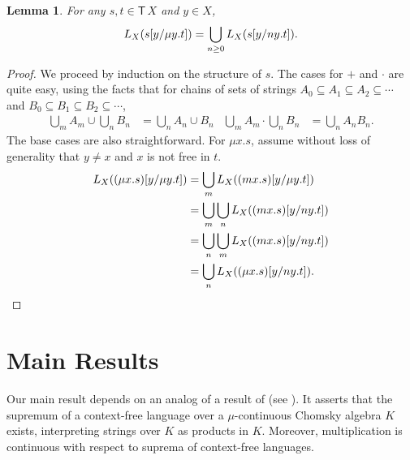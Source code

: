 \documentclass[copyright,creativecommons]{eptcs}
\newtheorem{lemma}[theorem]{Lemma}
\theoremstyle{remark}
\newcommand\subst[2]{[#1/#2]}
\newcommand\subs\subseteq
\newcommand\mathname[1]{\ensuremath{\mathsf{#1}}}
\newcommand\Tname{\mathname{T}}
\newcommand\T[1]{\Tname\,#1}
\newcommand{\fhcomment}[1]{\textcolor{red}{[\textbf{Comment (FH)}: {#1}]}}
\newcommand{\dkcomment}[1]{\textcolor{blue}{[\textbf{Comment (DK)}: {#1}]}}
\renewcommand{\fhcomment}[1]{}
\renewcommand{\dkcomment}[1]{}
\begin{document}
\begin{lemma}
\label{lem:freecont}
For any $s,t\in\T X$ and $y\in X$,
\fhcomment{Change: $p$ to $s$; $p$ is reminiscent of ``polynomial''.}\dkcomment{OK}\begin{align*}
\canon X(s\subst y{\mu y.t}) = \bigcup_{n\geq 0}\canon X(s\subst y{ny.t}).
\end{align*}
\end{lemma}
\begin{proof}
We proceed by induction on the structure of $s$.
The cases for $+$ and $\cdot$ are quite easy, using the facts that for chains of sets of strings $A_0\subs A_1\subs A_2\subs\cdots$ and $B_0\subs B_1\subs B_2\subs\cdots$,
\begin{align*}
\bigcup_m A_m\cup\bigcup_n B_n &= \bigcup_n A_n\cup B_n &
\bigcup_m A_m\cdot\bigcup_n B_n &= \bigcup_n A_nB_n.
\end{align*}
The base cases are also straightforward. For $\mu x.s$, assume without loss of generality that $y\neq x$ and $x$ is not free in $t$.
\begin{align*}
\canon X((\mu x.s)\subst y{\mu y.t}) &= \bigcup_m\canon X((mx.s)\subst y{\mu y.t})\\
&= \bigcup_m\bigcup_n\canon X((mx.s)\subst y{ny.t})\\
&= \bigcup_n\bigcup_m\canon X((mx.s)\subst y{ny.t})\\
&= \bigcup_n\canon X((\mu x.s)\subst y{ny.t}).
\end{align*}

\end{proof}



\section{Main Results}
\label{sec:main}

Our main result depends on an analog of a result of \cite{kozen81} (see \cite{K91a}). It asserts that the supremum of a context-free language over a $\mu$-continuous Chomsky algebra $K$ exists, interpreting strings over $K$ as products in $K$. Moreover, multiplication is continuous with respect to suprema of context-free languages.
\end{document}
